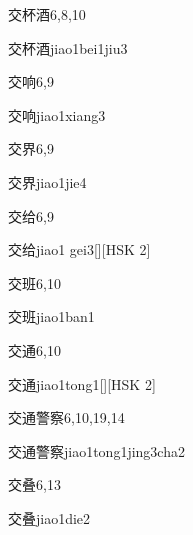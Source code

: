 \begin{entry}{交杯酒}{6,8,10}
  \begin{phonetics}{交杯酒}{jiao1bei1jiu3}
  \end{phonetics}
\end{entry}

\begin{entry}{交响}{6,9}
  \begin{phonetics}{交响}{jiao1xiang3}
  \end{phonetics}
\end{entry}

\begin{entry}{交界}{6,9}
  \begin{phonetics}{交界}{jiao1jie4}
  \end{phonetics}
\end{entry}

\begin{entry}{交给}{6,9}
  \begin{phonetics}{交给}{jiao1 gei3}[][HSK 2]
  \end{phonetics}
\end{entry}

\begin{entry}{交班}{6,10}
  \begin{phonetics}{交班}{jiao1ban1}
  \end{phonetics}
\end{entry}

\begin{entry}{交通}{6,10}
  \begin{phonetics}{交通}{jiao1tong1}[][HSK 2]
  \end{phonetics}
\end{entry}

\begin{entry}{交通警察}{6,10,19,14}
  \begin{phonetics}{交通警察}{jiao1tong1jing3cha2}
  \end{phonetics}
\end{entry}

\begin{entry}{交叠}{6,13}
  \begin{phonetics}{交叠}{jiao1die2}
  \end{phonetics}
\end{entry}

